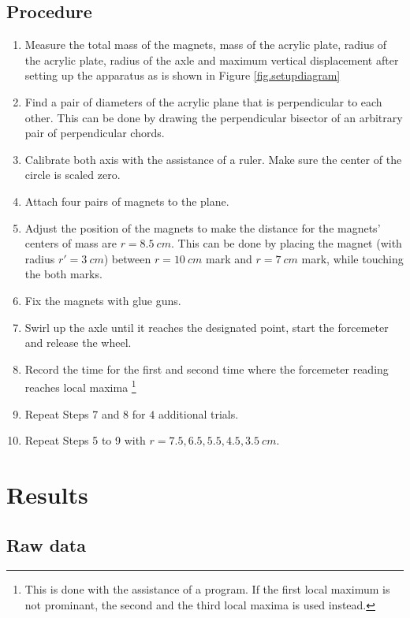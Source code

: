 \documentclass[a4paper]{article}
\begin{document}
\subsection{Procedure}

\begin{enumerate}
    \item Measure the total mass of the magnets, mass of the acrylic plate, radius of the acrylic plate, radius of the axle and maximum vertical displacement after setting up the apparatus as is shown in Figure \ref{fig.setupdiagram}
    \item Find a pair of diameters of the acrylic plane that is perpendicular to each other. This can be done by drawing the perpendicular bisector of an arbitrary pair of perpendicular chords. 
    \item Calibrate both axis with the assistance of a ruler. Make sure the center of the circle is scaled zero. 
    \item Attach four pairs of magnets to the plane.
    \item Adjust the position of the magnets to make the distance for the magnets' centers of mass are $r = \SI{8.5}{cm}$. This can be done by placing the magnet (with radius $r' = \SI{3}{cm}$) between $r = \SI{10}{cm}$ mark and $r = \SI{7}{cm}$ mark, while touching the both marks.
    \item Fix the magnets with glue guns.
    \item Swirl up the axle until it reaches the designated point, start the forcemeter and release the wheel. 
    \item Record the time for the first and second time where the forcemeter reading reaches local maxima \footnote{This is done with the assistance of a program. If the first local maximum is not prominant, the second and the third local maxima is used instead.} 
    \item Repeat Steps 7 and 8 for $4$ additional trials.
    \item Repeat Steps 5 to 9 with $r = 7.5, 6.5, 5.5, 4.5, 3.5 \SI{}{cm}$.
\end{enumerate}

\section{Results}
\label{sec.results}

\subsection{Raw data}
\end{document}
